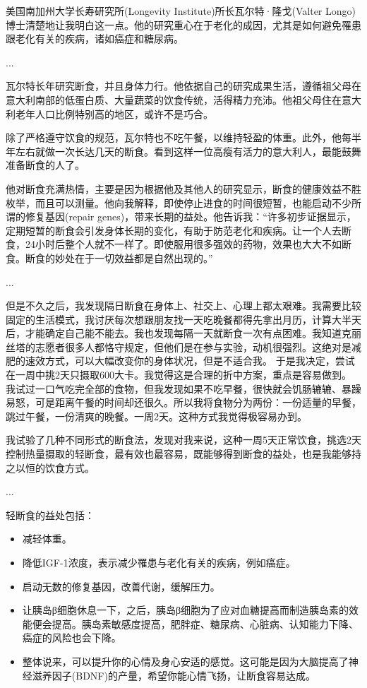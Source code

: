 \documentclass[12pt,oneside]{book}
\begin{document}
\begin{bookref}[frametitle={\cite{轻断食：正在横扫全球的瘦身革命}}]

美国南加州大学长寿研究所(Longevity Institute)所长瓦尔特·隆戈(Valter Longo)博士清楚地让我明白这一点。他的研究重心在于老化的成因，尤其是如何避免罹患跟老化有关的疾病，诸如癌症和糖尿病。

...

瓦尔特长年研究断食，并且身体力行。他依据自己的研究成果生活，遵循祖父母在意大利南部的低蛋白质、大量蔬菜的饮食传统，活得精力充沛。他祖父母住在意大利老年人口比例特别高的地区，或许不是巧合。

除了严格遵守饮食的规范，瓦尔特也不吃午餐，以维持轻盈的体重。此外，他每半年左右就做一次长达几天的断食。看到这样一位高瘦有活力的意大利人，最能鼓舞准备断食的人了。

他对断食充满热情，主要是因为根据他及其他人的研究显示，断食的健康效益不胜枚举，而且可以测量。他向我解释，即使停止进食的时间很短暂，也能启动不少所谓的修复基因(repair genes)，带来长期的益处。他告诉我：“许多初步证据显示，定期短暂的断食会引发身体长期的变化，有助于防范老化和疾病。让一个人去断食，24小时后整个人就不一样了。即使服用很多强效的药物，效果也大大不如断食。断食的妙处在于一切效益都是自然出现的。”

...

但是不久之后，我发现隔日断食在身体上、社交上、心理上都太艰难。我需要比较固定的生活模式，我讨厌每次想跟朋友找一天吃晚餐都得先拿出月历，计算大半天后，才能确定自己能不能去。我也发现每隔一天就断食一次有点困难。我知道克丽丝塔的志愿者很多人都恪守规定，但他们是在参与实验，动机很强烈。这绝对是减肥的速效方式，可以大幅改变你的身体状况，但是不适合我。
于是我决定，尝试在一周中挑2天只摄取600大卡。我觉得这是合理的折中方案，重点是容易做到。
我试过一口气吃完全部的食物，但我发现如果不吃早餐，很快就会饥肠辘辘、暴躁易怒，可是距离午餐的时间却还很久。所以我将食物分为两份：一份适量的早餐，跳过午餐，一份清爽的晚餐。一周2天。这种方式我觉得极容易办到。

我试验了几种不同形式的断食法，发现对我来说，这种一周5天正常饮食，挑选2天控制热量摄取的轻断食，最有效也最容易，既能够得到断食的益处，也是我能够持之以恒的饮食方式。

...

轻断食的益处包括：

\begin{itemize}
\item 减轻体重。
\item 降低IGF-1浓度，表示减少罹患与老化有关的疾病，例如癌症。
\item 启动无数的修复基因，改善代谢，缓解压力。
\item 让胰岛β细胞休息一下，之后，胰岛β细胞为了应对血糖提高而制造胰岛素的效能便会提高。胰岛素敏感度提高，肥胖症、糖尿病、心脏病、认知能力下降、癌症的风险也会下降。
\item 整体说来，可以提升你的心情及身心安适的感觉。这可能是因为大脑提高了神经滋养因子(BDNF)的产量，希望你能心情飞扬，让断食容易达成。



\end{itemize}
\end{bookref}
\end{document}
